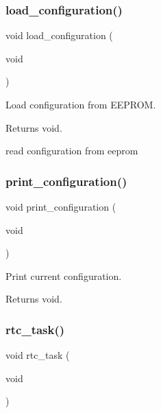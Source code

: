 \subsubsection{\texorpdfstring{load\+\_\+configuration()}{load\_configuration()}}
{\footnotesize\ttfamily void load\+\_\+configuration (\begin{DoxyParamCaption}\item[{void}]{ }\end{DoxyParamCaption})}



Load configuration from E\+E\+P\+R\+OM. 

\begin{DoxyReturn}{Returns}
void. 
\end{DoxyReturn}
read configuration from eeprom \mbox{\label{rmap_8ino_a65b2dadc0411e43874ec8ed7f73bc62a}} 
\subsubsection{\texorpdfstring{print\+\_\+configuration()}{print\_configuration()}}
{\footnotesize\ttfamily void print\+\_\+configuration (\begin{DoxyParamCaption}\item[{void}]{ }\end{DoxyParamCaption})}



Print current configuration. 

\begin{DoxyReturn}{Returns}
void. 
\end{DoxyReturn}
\mbox{\label{rmap_8ino_a52f7fb7ebbd710f2a06b3f6e47c7e7e3}} 
\subsubsection{\texorpdfstring{rtc\+\_\+task()}{rtc\_task()}}
{\footnotesize\ttfamily void rtc\+\_\+task (\begin{DoxyParamCaption}\item[{void}]{ }\end{DoxyParamCaption})}



